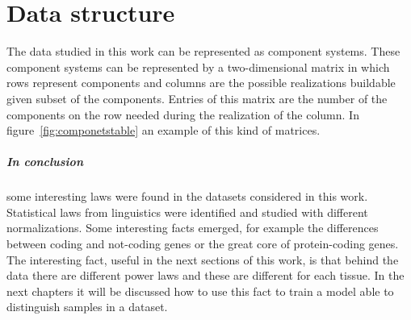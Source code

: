 \chapter{Data structure}\label{ch:structure}
The data studied in this work can be represented as component systems. These component systems can be represented by a two-dimensional matrix in which rows represent components and columns are the possible realizations buildable given subset of the components. Entries of this matrix are the number of the components on the row needed during the realization of the column. In figure~\ref{fig:componetstable} an example of this kind of matrices.









\paragraph{In conclusion} some interesting laws were found in the datasets considered in this work. Statistical laws from linguistics were identified and studied with different normalizations. Some interesting facts emerged, for example the differences between coding and not-coding genes or the great core of protein-coding genes. The interesting fact, useful in the next sections of this work, is that behind the data there are different power laws and these are different for each tissue. In the next chapters it will be discussed how to use this fact to train a model able to distinguish samples in a dataset. 
